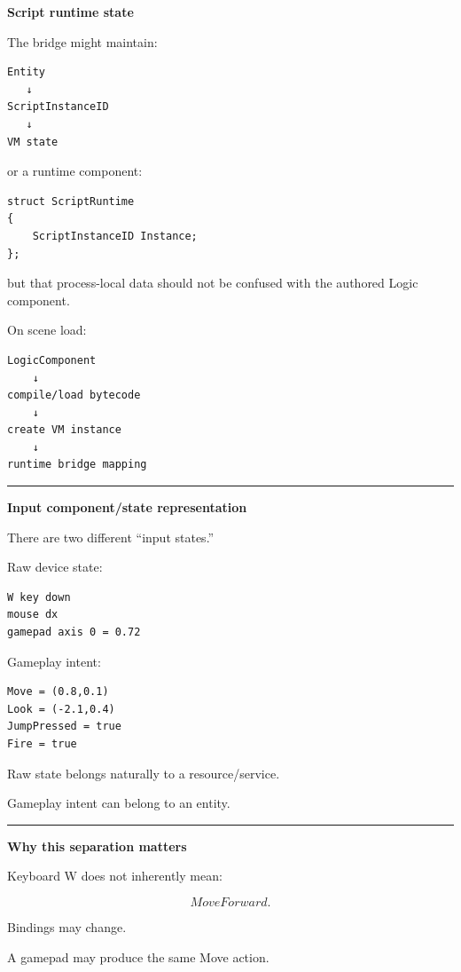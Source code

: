 \textbf{Script runtime state}

The bridge might maintain:

\begin{verbatim}
Entity
   ↓
ScriptInstanceID
   ↓
VM state
\end{verbatim}

or a runtime component:

\begin{verbatim}
struct ScriptRuntime
{
    ScriptInstanceID Instance;
};
\end{verbatim}

but that process-local data should not be confused with the authored Logic component.

On scene load:

\begin{verbatim}
LogicComponent
    ↓
compile/load bytecode
    ↓
create VM instance
    ↓
runtime bridge mapping
\end{verbatim}

\begin{center}\rule{0.5\linewidth}{0.5pt}\end{center}

\textbf{Input component/state representation}

There are two different ``input states.''

Raw device state:

\begin{verbatim}
W key down
mouse dx
gamepad axis 0 = 0.72
\end{verbatim}

Gameplay intent:

\begin{verbatim}
Move = (0.8,0.1)
Look = (-2.1,0.4)
JumpPressed = true
Fire = true
\end{verbatim}

Raw state belongs naturally to a resource/service.

Gameplay intent can belong to an entity.

\begin{center}\rule{0.5\linewidth}{0.5pt}\end{center}

\textbf{Why this separation matters}

Keyboard W does not inherently mean:

\[
MoveForward.
\]

Bindings may change.

A gamepad may produce the same Move action.


